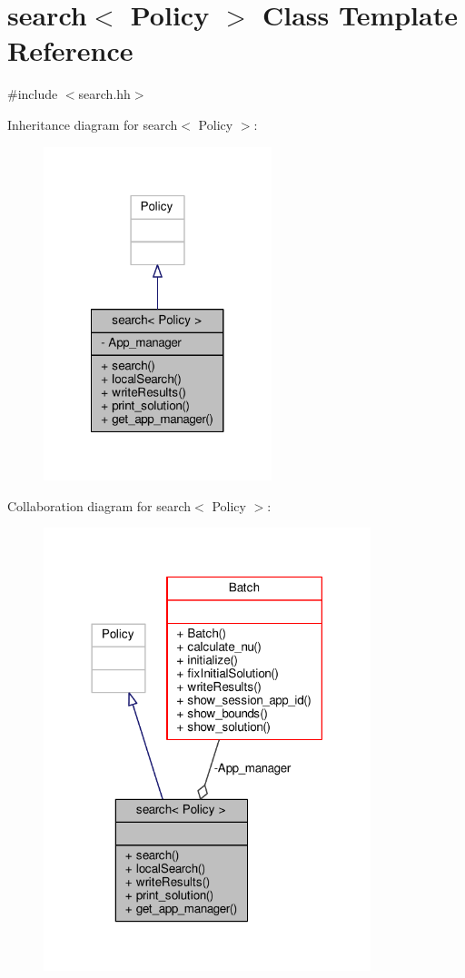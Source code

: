 \hypertarget{classsearch}{\section{search$<$ Policy $>$ Class Template Reference}
\label{classsearch}
}


{\ttfamily \#include $<$search.\-hh$>$}



Inheritance diagram for search$<$ Policy $>$\-:
\nopagebreak
\begin{figure}[H]
\begin{center}
\leavevmode
\includegraphics[width=188pt]{classsearch__inherit__graph}
\end{center}
\end{figure}


Collaboration diagram for search$<$ Policy $>$\-:
\nopagebreak
\begin{figure}[H]
\begin{center}
\leavevmode
\includegraphics[width=270pt]{classsearch__coll__graph}
\end{center}
\end{figure}
